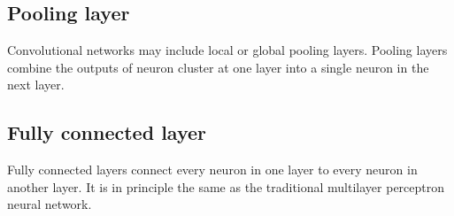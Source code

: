 \documentclass[a4paper, 12pt]{article}
\begin{document}
\subsection*{Pooling layer}
Convolutional networks may include local or global pooling layers. Pooling layers combine the outputs of neuron cluster at one layer into a single neuron in the next layer.
\subsection*{Fully connected layer}
Fully connected layers connect every neuron in one layer to every neuron in another layer. It is in principle the same as the traditional multilayer perceptron neural network.



\end{document}
